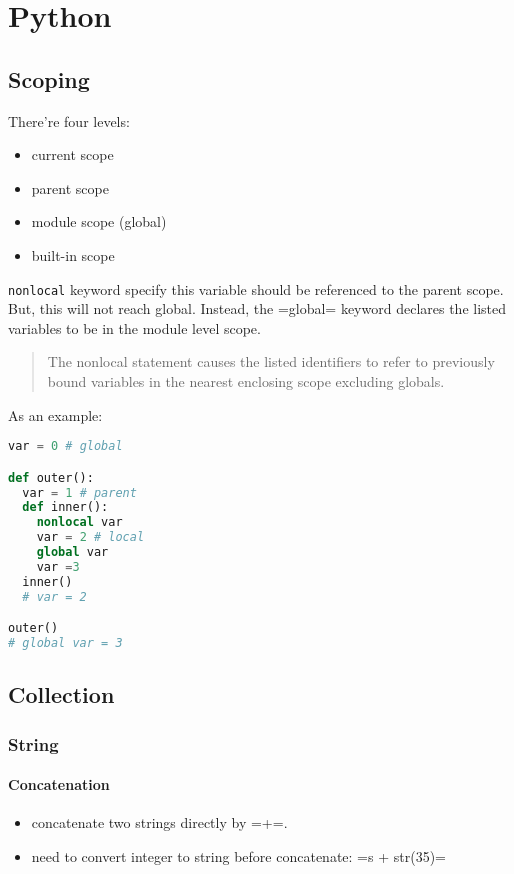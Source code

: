 \section{Python}
\subsection{Scoping}
There're four levels:
\begin{itemize}
\item current scope
\item parent scope
\item module scope (global)
\item built-in scope
\end{itemize}

\texttt{nonlocal} keyword specify this variable should be referenced
to the parent scope.  But, this will not reach global.  Instead, the
=global= keyword declares the listed variables to be in the module
level scope.

\begin{quote}
The nonlocal statement causes the listed identifiers to refer to previously bound variables in the nearest enclosing scope excluding globals.
\end{quote}

As an example:
\begin{lstlisting}[language=python]
var = 0 # global

def outer():
  var = 1 # parent
  def inner():
    nonlocal var
    var = 2 # local
    global var
    var =3
  inner()
  # var = 2

outer()
# global var = 3
\end{lstlisting}



\subsection{Collection}

\subsubsection{String}

\paragraph{Concatenation}
\begin{itemize}
\item concatenate two strings directly by =+=.
\item need to convert integer to string before concatenate: =s + str(35)=
\end{itemize}

